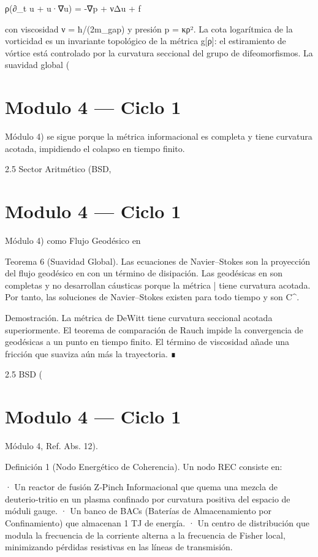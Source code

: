 \documentclass[12pt,twoside]{book}
\begin{document}
ρ(∂_t u + u·∇u) = -∇p + νΔu + f

con viscosidad ν = ħ/(2m_{gap}) y presión p = κρ². La cota logarítmica de la vorticidad es un invariante topológico de la métrica g[ρ]: el estiramiento de vórtice está controlado por la curvatura seccional del grupo de difeomorfismos. La suavidad global (

\chapter{Modulo 4 — Ciclo 1}
Módulo 4) se sigue porque la métrica informacional es completa y tiene curvatura acotada, impidiendo el colapso en tiempo finito.

2.5 Sector Aritmético (BSD, 

\chapter{Modulo 4 — Ciclo 1}
Módulo 4) como Flujo Geodésico en   

Teorema 6 (Suavidad Global). Las ecuaciones de Navier–Stokes son la proyección del flujo geodésico en    con un término de disipación. Las geodésicas en    son completas y no desarrollan cáusticas porque la métrica  \bar{}  tiene curvatura acotada. Por tanto, las soluciones de Navier–Stokes existen para todo tiempo y son  C^\infty .

Demostración. La métrica de DeWitt tiene curvatura seccional acotada superiormente. El teorema de comparación de Rauch impide la convergencia de geodésicas a un punto en tiempo finito. El término de viscosidad añade una fricción que suaviza aún más la trayectoria. ∎

2.5 BSD (

\chapter{Modulo 4 — Ciclo 1}
Módulo 4, Ref. Abs. 12).

Definición 1 (Nodo Energético de Coherencia). Un nodo REC consiste en:

· Un reactor de fusión Z‑Pinch Informacional que quema una mezcla de deuterio‑tritio en un plasma confinado por curvatura positiva del espacio de móduli gauge.
· Un banco de BACs (Baterías de Almacenamiento por Confinamiento) que almacenan 1 TJ de energía.
· Un centro de distribución que modula la frecuencia de la corriente alterna a la frecuencia de Fisher local, minimizando pérdidas resistivas en las líneas de transmisión.
\end{document}
